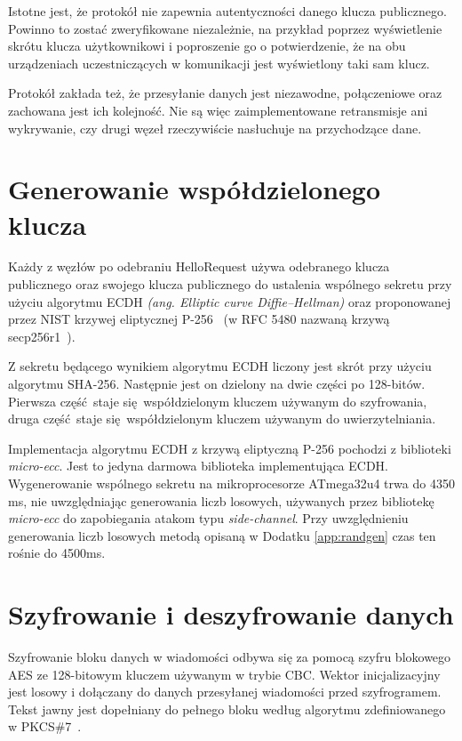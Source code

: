 Istotne jest, że protokół nie zapewnia autentyczności danego klucza publicznego. Powinno to zostać zweryfikowane niezależnie, na przykład poprzez wyświetlenie skrótu klucza użytkownikowi i poproszenie go o potwierdzenie, że na obu urządzeniach uczestniczących w komunikacji jest wyświetlony taki sam klucz.

Protokół zakłada też, że przesyłanie danych jest niezawodne, połączeniowe oraz zachowana jest ich kolejność. Nie są więc zaimplementowane retransmisje ani wykrywanie, czy drugi węzeł rzeczywiście nasłuchuje na przychodzące dane.

\section{Generowanie współdzielonego klucza}
\label{sec:sharedkey}

Każdy z węzłów po odebraniu HelloRequest używa odebranego klucza publicznego oraz swojego klucza publicznego do ustalenia wspólnego sekretu przy użyciu algorytmu ECDH \emph{(ang. Elliptic curve Diffie--Hellman)} oraz proponowanej przez NIST krzywej eliptycznej P-256~\cite{kerry2013digital} (w RFC 5480 nazwaną krzywą secp256r1~\cite{turner2009elliptic}).

Z sekretu będącego wynikiem algorytmu ECDH liczony jest skrót przy użyciu algorytmu SHA-256. Następnie jest on dzielony na dwie części po 128-bitów. Pierwsza część staje się współdzielonym kluczem używanym do szyfrowania, druga część staje się współdzielonym kluczem używanym do uwierzytelniania.

Implementacja algorytmu ECDH z krzywą eliptyczną P-256 pochodzi z biblioteki \emph{micro-ecc}. Jest to jedyna darmowa biblioteka implementująca ECDH. Wygenerowanie wspólnego sekretu na mikroprocesorze ATmega32u4 trwa do 4350 ms, nie uwzględniając generowania liczb losowych, używanych przez bibliotekę \emph{micro-ecc} do zapobiegania atakom typu \emph{side-channel}. Przy uwzględnieniu generowania liczb losowych metodą opisaną w Dodatku \ref{app:randgen} czas ten rośnie do 4500ms.

\section{Szyfrowanie i deszyfrowanie danych}
\label{sec:encrypt}

Szyfrowanie bloku danych w wiadomości odbywa się za pomocą szyfru blokowego AES ze 128-bitowym kluczem używanym w trybie CBC. Wektor inicjalizacyjny jest losowy i dołączany do danych przesyłanej wiadomości przed szyfrogramem. Tekst jawny jest dopełniany do pełnego bloku według algorytmu zdefiniowanego w PKCS\#7~\cite{kaliski1998pkcs}.

